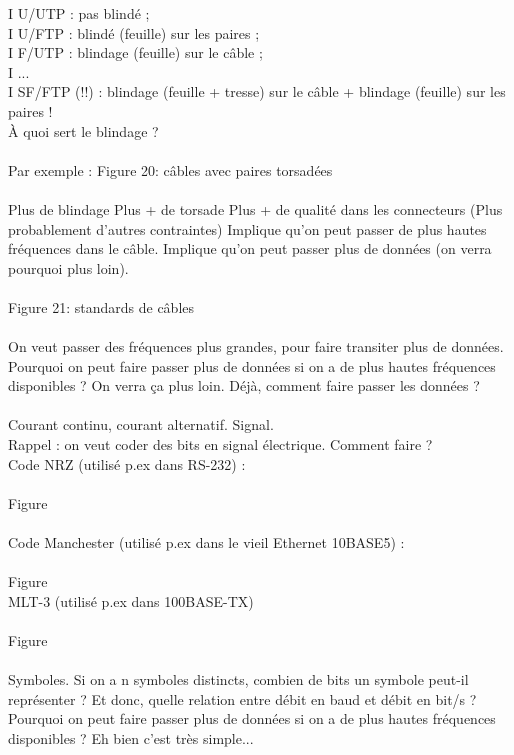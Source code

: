 \documentclass[5pt]{article}
\begin{document}
\begin{scriptsize}
I U/UTP : pas blindé ;\\
I U/FTP : blindé (feuille) sur les paires ;\\
I F/UTP : blindage (feuille) sur le câble ;\\
I ...\\
I SF/FTP (!!) : blindage (feuille + tresse) sur le câble + blindage (feuille) sur les paires !\\
À quoi sert le blindage ?\\
\\
Par exemple : Figure 20: câbles avec paires torsadées\\
\\
Plus de blindage Plus + de torsade Plus + de qualité dans les connecteurs (Plus probablement d’autres contraintes) Implique qu’on peut passer de plus hautes fréquences dans le câble. Implique qu’on peut passer plus de données (on verra pourquoi plus loin).\\
\\
Figure 21: standards de câbles\\
\\
On veut passer des fréquences plus grandes, pour faire transiter plus de données. Pourquoi on peut faire passer plus de données si on a de plus hautes fréquences disponibles ? On verra ça plus loin. Déjà, comment faire passer les données ?\\
\\
Courant continu, courant alternatif. Signal.\\
Rappel : on veut coder des bits en signal électrique. Comment faire ?\\
Code NRZ (utilisé p.ex dans RS-232) :\\
\\
Figure\\
\\
Code Manchester (utilisé p.ex dans le vieil Ethernet 10BASE5) :\\
\\
Figure\\
MLT-3 (utilisé p.ex dans 100BASE-TX)\\
\\
Figure\\
\\
Symboles. Si on a n symboles distincts, combien de bits un symbole peut-il représenter ? Et donc, quelle relation entre débit en baud et débit en bit/s ?\\
Pourquoi on peut faire passer plus de données si on a de plus hautes fréquences disponibles ? Eh bien c’est très simple...\\

\end{scriptsize}
\end{document}
